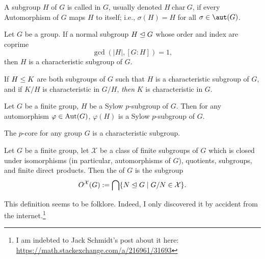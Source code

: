 \begin{definition}
A subgroup $H$ of $G$ is called  in $G$, usually
denoted $H~\mathrm{char}~G$, if every Automorphism of $G$ maps $H$ to
itself; i.e., $\sigma(H)=H$ for all $\sigma\in\aut(G)$.
\end{definition}

\begin{theorem}
Let $G$ be a group. If a normal subgroup $H\trianglelefteq G$ whose
order and index are coprime
\begin{equation*}
\gcd(|H|, [G:H])=1,
\end{equation*}
then $H$ is a characteristic subgroup of $G$.
\end{theorem}

\begin{theorem}
If  $H\leq K$ are both subgroups of $G$ such that $H$ is
a characteristic subgroup of $G$, and if $K/H$ is characteristic in
$G/H$, \emph{then} $K$ is characteristic in $G$.
\end{theorem}

\begin{lemma}
Let $G$ be a finite group, $H$ be a Sylow $p$-subgroup of $G$. Then for
any automorphism $\varphi\in\operatorname{Aut}(G)$, $\varphi(H)$ is a Sylow
$p$-subgroup of $G$.
\end{lemma}

\begin{theorem}
The $p$-core for any group $G$ is a characteristic subgroup.
\end{theorem}

\begin{definition}
Let $G$ be a finite group, let $\mathcal{X}$ be a class of finite
subgroups of $G$ which is closed under isomorphisms (in particular,
automorphisms of $G$), quotients, subgroups, and finite direct products.
Then the  of $G$ is the subgroup
\begin{equation}
  O^{\mathcal{X}}(G) := \bigcap\{N\trianglelefteq G\mid G/N\in\mathcal{X}\}.
\end{equation}
\end{definition}

\begin{def-remark}
This definition seems to be folklore. Indeed, I only discovered it by
accident from the internet.\footnote{I am indebted to Jack Schmidt's
post about it here: \url{https://math.stackexchange.com/a/216961/31693}}
\end{def-remark}

